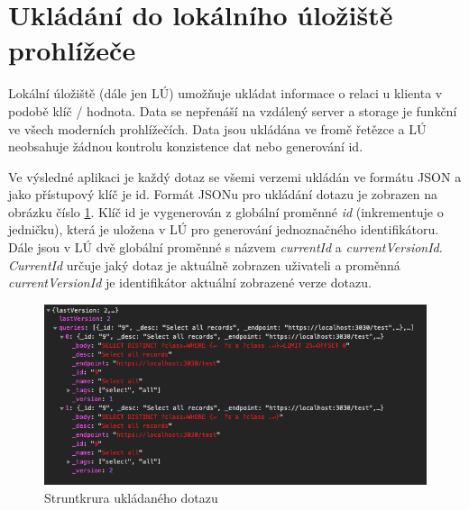 \documentclass[
12pt,
a4paper,
pdftex,
czech,
titlepage
]{report}
\begin{document}
\section{Ukládání do lokálního úložiště prohlížeče}
Lokální úložiště (dále jen LÚ) umožňuje ukládat informace o relaci u klienta v podobě klíč / hodnota. Data se nepřenáší na vzdálený server a storage je funkční ve všech moderních prohlížečích. Data jsou ukládána ve fromě řetězce a LÚ neobsahuje žádnou kontrolu konzistence dat nebo generování id.
\par
Ve výsledné aplikaci je každý dotaz se všemi verzemi ukládán ve formátu JSON a jako přístupový klíč je id. Formát JSONu pro ukládání dotazu je zobrazen na obrázku číslo \ref{img_json}. Klíč id je vygenerován z globální proměnné \textit{id} (inkrementuje o jedničku), která je uložena v LÚ pro generování jednoznačného identifikátoru. Dále jsou v LÚ dvě globální proměnné s názvem \textit{currentId} a \textit{currentVersionId}. \textit{CurrentId} určuje jaký dotaz je aktuálně zobrazen uživateli a proměnná \textit{currentVersionId} je identifikátor aktuální zobrazené verze dotazu.
\begin{figure}[h]
	\centering
	\includegraphics[scale=0.55]{img/json.png}
	\caption{Struntkrura ukládaného dotazu}
	\label{img_json}
\end{figure}
\end{document}

